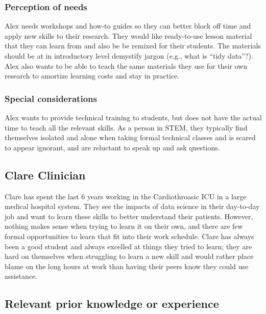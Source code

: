 \documentclass[020-persona\_validation.tex]{subfiles}
\begin{document}
        \subsubsection{Perception of needs}

            Alex needs workshops and how-to guides so they can better block off time and apply new skills to their research.
            They would like ready-to-use lesson material that they can learn from and also be be remixed for their students.
            The materials should be at in introductory level demystify jargon (e.g., what is ``tidy data''?).
            Alex also wants to be able to teach the same materials they use for their own research
            to amortize learning costs and stay in practice.

        \subsubsection{Special considerations}

            Alex wants to provide technical training to students,
            but does not have the actual time to teach all the relevant skills.
            As a person in STEM,
            they typically find themselves isolated and alone when taking formal technical classes and
            is scared to appear ignorant, and are reluctant to speak up and ask questions.


    \subsection{Clare Clinician}

        Clare has spent the last 6 years working in the Cardiothroasic ICU in a large medical hospital system.
        They see the impacts of data science in their day-to-day job
        and want to learn these skills to better understand their patients.
        However, nothing makes sense when trying to learn it on their own,
        and there are few formal opportunities to learn that fit into their work schedule.
        Clare has always been a good student and always excelled at things they tried to learn;
        they are hard on themselves when struggling to learn a new skill and
        would rather place blame on the long hours at work than having their peers know they could use assistance.

        \subsection{Relevant prior knowledge or experience}
\end{document}
